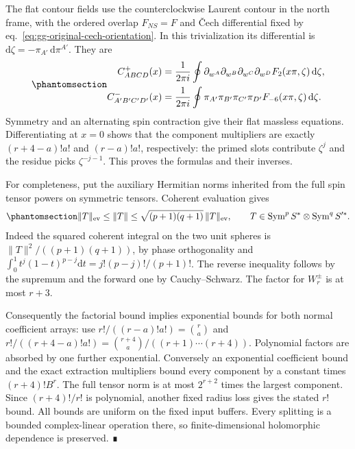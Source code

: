\documentclass[
  english,
  11pt,
  reqno]{amsart}
\begin{document}
The flat contour fields use the counterclockwise Laurent contour in the
north frame, with the ordered overlap \(F_{NS}=F\) and Čech differential
fixed by eq.~\ref{eq:gg-original-cech-orientation}. In this
trivialization its differential is
\(\mathrm d\zeta=-\pi_{A'}\,\mathrm d\pi^{A'}\). They are
\begin{equation}\protect\phantomsection\label{eq:gg-flat-contours}{
 \begin{aligned}
 C^+_{ABCD}(x)
 &=\frac1{2\pi i}\oint
   \partial_{w^A}\partial_{w^B}
   \partial_{w^C}\partial_{w^D}F_2(x\pi,\zeta)\,
   \mathrm d\zeta,\\
 C^-_{A'B'C'D'}(x)
 &=\frac1{2\pi i}\oint
   \pi_{A'}\pi_{B'}\pi_{C'}\pi_{D'}
   F_{-6}(x\pi,\zeta)\,\mathrm d\zeta .
 \end{aligned}
}\end{equation} Symmetry and an alternating spin contraction give their
flat massless equations. Differentiating at \(x=0\) shows that the
component multipliers are exactly \((r+4-a)!a!\) and \((r-a)!a!\),
respectively: the primed slots contribute \(\zeta^j\) and the residue
picks \(\zeta^{-j-1}\). This proves the formulas and their inverses.

For completeness, put the auxiliary Hermitian norms inherited from the
full spin tensor powers on symmetric tensors. Coherent evaluation gives
\begin{equation}\protect\phantomsection\label{eq:gg-coherent-norm}{
 \|T\|_{\mathrm{ev}}\le\|T\|
 \le\sqrt{(p+1)(q+1)}\,\|T\|_{\mathrm{ev}},
 \qquad
 T\in\operatorname{Sym}^pS^*\otimes\operatorname{Sym}^qS'^* .
}\end{equation} Indeed the squared coherent integral on the two unit
spheres is \(\|T\|^2/((p+1)(q+1))\), by phase orthogonality and
\(\int_0^1 t^j(1-t)^{p-j}\mathrm dt=j!(p-j)!/(p+1)!\). The reverse
inequality follows by the supremum and the forward one by
Cauchy--Schwarz. The factor for \(W_r^\pm\) is at most \(r+3\).

Consequently the factorial bound implies exponential bounds for both
normal coefficient arrays: use \(r!/((r-a)!a!)=\binom ra\) and
\(r!/((r+4-a)!a!)=\binom{r+4}a/((r+1)\cdots(r+4))\). Polynomial factors
are absorbed by one further exponential. Conversely an exponential
coefficient bound and the exact extraction multipliers bound every
component by a constant times \((r+4)!B^r\). The full tensor norm is at
most \(2^{r+2}\) times the largest component. Since \((r+4)!/r!\) is
polynomial, another fixed radius loss gives the stated \(r!\) bound. All
bounds are uniform on the fixed input buffers. Every splitting is a
bounded complex-linear operation there, so finite-dimensional
holomorphic dependence is preserved. ∎
\end{document}
